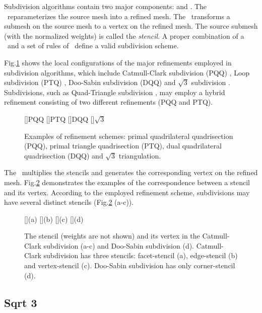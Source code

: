 Subdivision algorithms contain two major
components: \emph{\tr} and \emph{\gm}.
The \tr\ reparameterizes the source mesh into a refined 
mesh. The \gm\ transforms a submesh on the source mesh
to a vertex on the refined mesh. The source submesh (with
the normalized weights) is called the
\emph{stencil}. A proper combination of a \tr\ and a set of 
rules of \gm\ define a valid subdivision scheme.

Fig.\ref{fig:RefSchemes} shows the local configurations 
of the major refinements
employed in subdivision algorithms, which include Catmull-Clark
subdivision (PQQ) \cite{cc}, Loop subdivision (PTQ) \cite{loop},
Doo-Sabin subdivision (DQQ) \cite{ds} and $\sqrt{3}$ subdivision
\cite{sqrt3}. Subdivisions, such as Quad-Triangle subdivision 
\cite{qts,l-pg-03}, may employ a hybrid refinement consisting
of two different refinements (PQQ and PTQ).
\begin{figure}
  \centering
  []{\scriptsize PQQ} 
  []{\scriptsize PTQ}
  []{\scriptsize DQQ} 
  []{\scriptsize $\sqrt{3}$} 
  \caption{Examples of refinement schemes: 
    primal quadrilateral quadrisection (PQQ),
    primal triangle quadrisection (PTQ),
    dual quadrilateral quadrisection (DQQ) and
    $\sqrt{3}$ triangulation.}
  \label{fig:RefSchemes}
\end{figure}
The \gm\ multiplies the stencils and
generates the corresponding vertex on the refined mesh.
Fig.\ref{fig:RefMap} demonstrates the examples of the
correspondence between a stencil and its vertex. According 
to the employed refinement scheme, subdivisions 
may have several distinct stencils 
(Fig.\ref{fig:RefMap} (a-c)). 
\begin{figure}
  \centering
  []{(a)}
  []{(b)}
  []{(c)}
  []{(d)}
  \caption{The stencil (weights are not shown) and its 
           vertex in the Catmull-Clark subdivision (a-c)
           and Doo-Sabin subdivision (d). Catmull-Clark
           subdivision has three stencils: facet-stencil (a), 
           edge-stencil (b) and vertex-stencil (c). 
           Doo-Sabin subdivision has only corner-stencil (d).}
  \label{fig:RefMap}
\end{figure}




\subsection{Sqrt 3}


%

